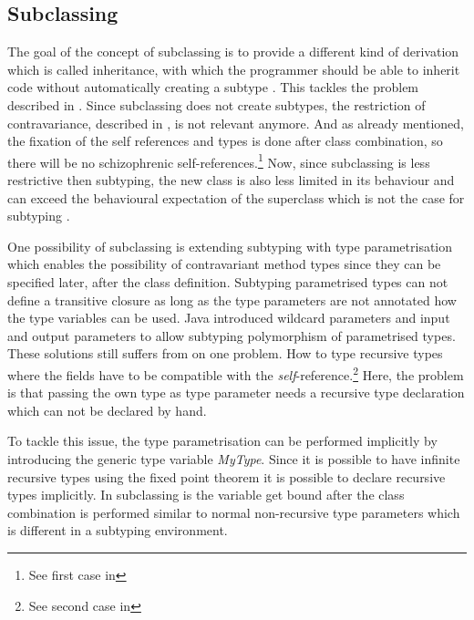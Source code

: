 \subsection{Subclassing}

The goal of the concept of subclassing is to provide a different
kind of derivation which is called inheritance, with which the
programmer should be able to inherit code without automatically creating a
subtype \cite{simons_theory_2002-2}. This tackles the problem described in
. Since subclassing does not create subtypes, the
restriction of contravariance, described in ,
is not relevant anymore. And as already mentioned, the fixation of
the self references and types is done after class combination, so there
will be no schizophrenic self-references.\footnote{See first case in
} Now, since subclassing is less restrictive
then subtyping, the new class is also less limited in its behaviour and
can exceed the behavioural expectation of the superclass which is not
the case for subtyping \cite{simons_theory_2002-2}.

One possibility of subclassing is extending subtyping with type
parametrisation which enables the possibility of contravariant
method types since they can be specified later, after the class
definition. Subtyping parametrised types can not define a transitive
closure as long as the type parameters are not annotated how the
type variables can be used. Java introduced wildcard parameters and
\cs input and output parameters to allow subtyping polymorphism
of parametrised types. These solutions still suffers from on one
problem. How to type recursive types where the fields have to be
compatible with the \emph{self}-reference.\footnote{See second case in
} Here, the problem is that passing the own
type as type parameter needs a recursive type declaration which can not
be declared by hand.

To tackle this issue, the type parametrisation can be performed implicitly
by introducing the generic type variable \emph{MyType}. Since it is
possible to have infinite recursive types using the fixed point theorem
\cite{pierce_types_2002} it is possible to declare recursive types
implicitly. In subclassing is the \mytype variable get bound after the
class combination is performed similar to normal non-recursive type
parameters which is different in a subtyping environment.

